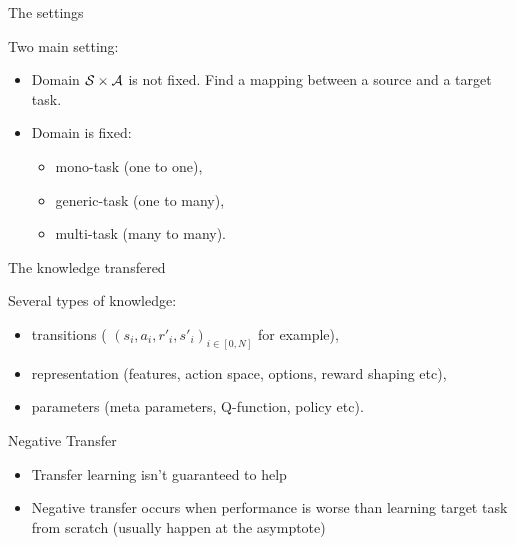 \documentclass{beamer}
\begin{document}
    \begin{frame}{The settings}

        Two main setting:

        \begin{itemize}
            \item Domain $\mathcal{S}\times \mathcal{A}$ is not fixed. Find a mapping between a source and a target task.
            \item Domain is fixed:
            \begin{itemize}
                \item mono-task (one to one),
                \item generic-task (one to many),
                \item multi-task  (many to many).
            \end{itemize}
        \end{itemize}

    \end{frame}

    \begin{frame}{The knowledge transfered}

        Several types of knowledge:
        \begin{itemize}
            \item transitions ( ${(s_i,a_i,r'_i,s'_i)}_{i\in[0,N]}$ for example),
            \item representation (features, action space, options, reward shaping etc),
            \item parameters (meta parameters, Q-function, policy etc).
        \end{itemize}

    \end{frame}

    \begin{frame}{Negative Transfer}

        \begin{itemize}
            \item Transfer learning isn’t guaranteed to help
            \item Negative transfer occurs when performance is worse than learning
            target task from scratch (usually happen at the asymptote)
        \end{itemize}

    \end{frame}


\end{document}
